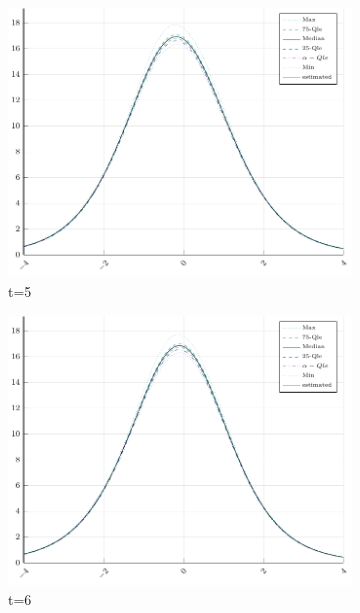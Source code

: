 \begin{figure}[H]
\begin{subfigure}[t]{0.31\textwidth}
		\includegraphics[width=\linewidth]{Figures/real/5_infoplot.pdf}
		\caption{t=5} 
	\end{subfigure}
	\begin{subfigure}[t]{0.31\textwidth}
		\centering
		\includegraphics[width=\linewidth]{Figures/real/6_infoplot.pdf}
		\caption{t=6} 
	\end{subfigure}\\
	\begin{subfigure}[t]{0.31\textwidth}
		\centering

\end{subfigure}
\end{figure}
